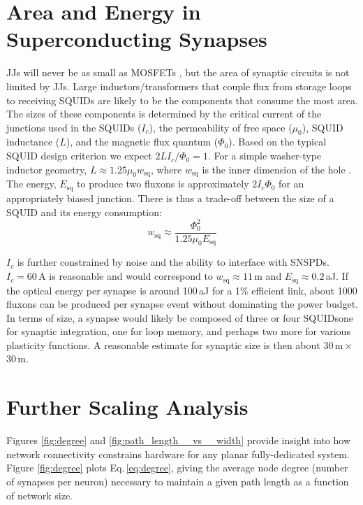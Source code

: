 \documentclass[twocolumn]{article}
\begin{document}
\section{Area and Energy in Superconducting Synapses}\label{apx:squid_area}
JJs will never be as small as MOSFETs \cite{tolpygo2016superconductor}, but the area of synaptic circuits is not limited by JJs. Large inductors/transformers that couple flux from storage loops to receiving SQUIDs are likely to be the components that consume the most area. The sizes of these components is determined by the critical current of the junctions used in the SQUIDs ($I_c$), the permeability of free space ($\mu_0$), SQUID inductance ($L$), and the magnetic flux quantum ($\Phi_0$). Based on the typical SQUID design criterion \cite{clbr2006} we expect $2LI_c/\Phi_0 = 1$. For a simple washer-type inductor geometry, $L \approx 1.25\mu_0 w_{\mathrm{sq}}$, where $w_{\mathrm{sq}}$ is the inner dimension of the hole \cite{jaycox1981planar}. The energy, $E_{\mathrm{sq}}$ to produce two fluxons is approximately $2I_c\Phi_0$ for an appropriately biased junction. There is thus a trade-off between the size of a SQUID and its energy consumption:
\begin{equation}
    w_{\mathrm{sq}} \approx \frac{\Phi_0^2}{1.25\mu_0E_{\mathrm{sq}}}
\end{equation}

$I_c$ is further constrained by noise and the ability to interface with SNSPDs. $I_c = 60$\,\textmu A is reasonable and would correspond to $w_{\mathrm{sq}}\approx11$\,\textmu m and $E_{\mathrm{sq}} \approx 0.2$\,aJ. If the optical energy per synapse is around 100\,aJ for a 1\% efficient link, about 1000 fluxons can be produced per synapse event without dominating the power budget. In terms of size, a synapse would likely be composed of three or four SQUIDs\textemdash one for synaptic integration, one for loop memory, and perhaps two more for various plasticity functions. A reasonable estimate for synaptic size is then about 30\,\textmu m\,$\times$\,30\,\textmu m. 

\section{Further Scaling Analysis}\label{apx:scaling}
Figures \ref{fig:degree} and \ref{fig:path_length__vs__width} provide insight into how network connectivity constrains hardware for any planar fully-dedicated system. Figure \ref{fig:degree} plots Eq.\,\ref{eq:degree}, giving the average node degree (number of synapses per neuron) necessary to maintain a given path length as a function of network size.
\end{document}
